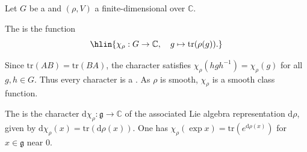 \begin{definition} \label{definition:character_of_a_lie_group_representation_over_the_complex_numbers}

    Let $G$ be a  and $(\rho, V)$ a finite-dimensional  over $\mathbb{C}$.

    The  is the function
    $$\hlin{\chi_\rho : G \to \mathbb{C}, \quad g \mapsto \mathrm{tr}(\rho(g)).}$$

    Since $\mathrm{tr}(AB) = \mathrm{tr}(BA)$, the character satisfies $\chi_\rho(hgh^{-1}) = \chi_\rho(g)$ for all $g, h \in G$. Thus every character is a . As $\rho$ is smooth, $\chi_\rho$ is a smooth class function.

    The  is the character $\mathrm{d}\chi_\rho : \mathfrak{g} \to \mathbb{C}$ of the associated Lie algebra representation $\mathrm{d}\rho$, given by $\mathrm{d}\chi_\rho(x) = \mathrm{tr}(\mathrm{d}\rho(x))$. One has $\chi_\rho(\exp x) = \mathrm{tr}(e^{\mathrm{d}\rho(x)})$ for $x \in \mathfrak{g}$ near $0$.
\end{definition}
